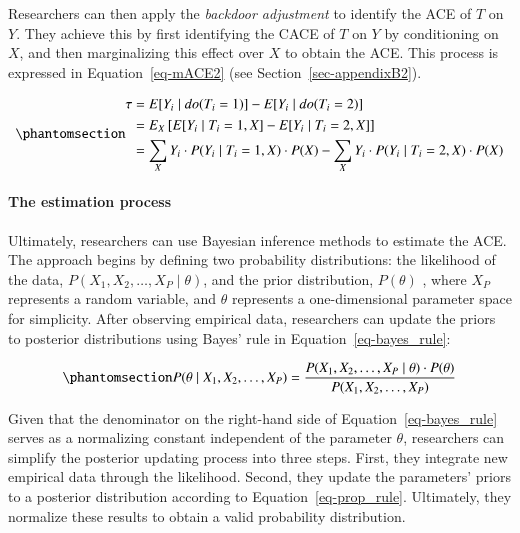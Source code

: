 \documentclass[
  authoryear,
  review,
  1p]{elsarticle}
\let\oldparagraph\paragraph
\renewcommand{\paragraph}[1]{\oldparagraph{#1}\mbox{}}
\begin{document}
Researchers can then apply the \emph{backdoor adjustment} to identify
the ACE of \(T\) on \(Y\). They achieve this by first identifying the
CACE of \(T\) on \(Y\) by conditioning on \(X\), and then marginalizing
this effect over \(X\) to obtain the ACE. This process is expressed in
Equation~\ref{eq-mACE2} (see Section~\ref{sec-appendixB2}).

\begin{equation}\phantomsection\label{eq-mACE2}{
\begin{aligned}
  \tau & = E[Y_{i} \mid do(T_{i}=1)]- E[Y_{i} \mid do(T_{i}=2)] \\
  & = E_{X}\left[ E[Y_{i} \mid T_{i}=1, X] - E[Y_{i} \mid T_{i}=2, X] \right] \\
  & = \sum_{X} Y_{i} \cdot P( Y_{i} \mid T_{i}=1, X) \cdot P(X) - \sum_{X} Y_{i} \cdot P( Y_{i} \mid T_{i}=2, X) \cdot P(X)
\end{aligned}
}\end{equation}

\paragraph{The estimation process}\label{sec-appendixB34}

Ultimately, researchers can use Bayesian inference methods to estimate
the ACE. The approach begins by defining two probability distributions:
the likelihood of the data,
\(P(X_{1}, X_{2}, \dots, X_{P} \mid \theta)\), and the prior
distribution, \(P(\theta)\) \citep{Everitt_et_al_2010}, where \(X_{P}\)
represents a random variable, and \(\theta\) represents a
one-dimensional parameter space for simplicity. After observing
empirical data, researchers can update the priors to posterior
distributions using Bayes' rule in Equation~\ref{eq-bayes_rule}:

\begin{equation}\phantomsection\label{eq-bayes_rule}{
P(\theta \mid X_{1}, X_{2}, \dots, X_{P}) = \frac{P(X_{1}, X_{2}, \dots, X_{P} \mid \theta) \cdot P(\theta)}{P(X_{1}, X_{2}, \dots, X_{P})}
}\end{equation}

Given that the denominator on the right-hand side of
Equation~\ref{eq-bayes_rule} serves as a normalizing constant
independent of the parameter \(\theta\), researchers can simplify the
posterior updating process into three steps. First, they integrate new
empirical data through the likelihood. Second, they update the
parameters' priors to a posterior distribution according to
Equation~\ref{eq-prop_rule}. Ultimately, they normalize these results to
obtain a valid probability distribution.
\end{document}
